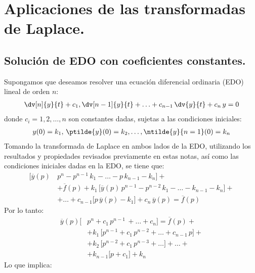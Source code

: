 \section{Aplicaciones de las transformadas de Laplace.}

\subsection{Solución de EDO con coeficientes constantes.}

Supongamos que deseamos resolver una ecuación diferencial ordinaria (EDO) lineal de orden $n$:
\begin{align}
\dv[n]{y}{t} + c_{1} , \dv[n-1]{y}{t} + \ldots + c_{n-1} \, \dv{y}{t} + c_{n} \, y = 0
\label{eq:ecuacion_04_54}
\end{align}
donde $c_{i} = 1, 2, \ldots, n$ son constantes dadas, sujetas a las condiciones iniciales:
\begin{align*}
y(0) = k_{1}, \, \ptilde{y}(0) = k_{2} , \ldots, \ntilde{y}{n=1}(0)= k_{n}
\end{align*}
Tomando la transformada de Laplace en ambos lados de la EDO, utilizando los resultados y propiedades revisados previamente en estas notas, así como las condiciones iniciales dadas en la EDO, se tiene que:
\begin{align*}
\big[\overline{y}(p) \, &p^{n} - p^{n-1} \, k_{1} - \ldots - p \, k_{n-1} - k_{n} \big] + \\[0.5em] &+ \overline{f}(p) + k_{1} \, \big[\overline{y}(p) \, p^{n-1} - p^{n-2} \, k_{1} - \ldots - k_{n-1} - k_{n} \big] + \\[0.5em]
&+ \ldots + c_{n-1} \big[p \, \overline{y}(p) - k_{1} \big] + c_{n} \, \overline{y}(p) = \overline{f}(p)
\end{align*}
Por lo tanto:
\begin{align*}
\overline{y}(p) \big[&p^{n} + c_{1} \, p^{n-1} \, + \ldots + c_{n} \big] = \overline{f}(p) + \\[0.5em]
&+ k_{1} \, \big[p^{n-1} + c_{1} \, p^{n-2} + \ldots + c_{n-1} \, p\big] + \\[0.5em]
&+ k_{2} \, \big[p^{n-2} + c_{1} \, p^{n-3} + \ldots \big] +  \ldots + \\[0.5em]
&+ k_{n-1} \big[p + c_{1} \big] + k_{n}
\end{align*}
Lo que implica:
